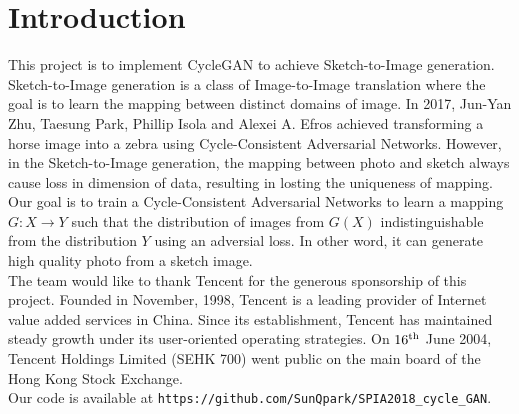 \chapter{Introduction}\label{Ch:Introduction}
This project is to implement CycleGAN to achieve Sketch-to-Image generation. Sketch-to-Image generation is a class of Image-to-Image translation where the goal is to learn the mapping between distinct domains of image. In 2017, Jun-Yan Zhu, Taesung Park, Phillip Isola and Alexei A. Efros achieved transforming a horse image into a zebra using Cycle-Consistent Adversarial Networks. However, in the Sketch-to-Image generation, the mapping between photo and sketch always cause loss in dimension of data, resulting in losting the uniqueness of mapping. Our goal is to train a Cycle-Consistent Adversarial Networks to learn a mapping \(G:X \rightarrow Y\) such that the distribution of images from \(G(X)\) indistinguishable from the distribution \(Y\) using an adversial loss. In other word, it can generate high quality photo from a sketch image.\\%

The team would like to thank Tencent for the generous sponsorship of this project. Founded in November, 1998, Tencent is a leading provider of Internet value added services in China. Since its establishment, Tencent has maintained steady growth under its user-oriented operating strategies. On \(16^{\textnormal{th}}\) June 2004, Tencent Holdings Limited (SEHK 700) went public on the main board of the Hong Kong Stock Exchange.\\





Our code is available at \texttt{https://github.com/SunQpark/SPIA2018\_cycle\_GAN}.




\endinput
